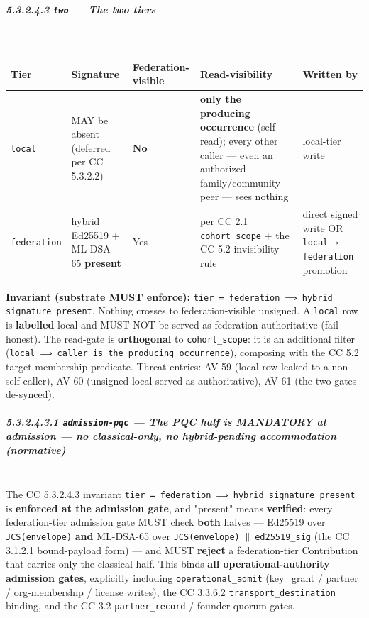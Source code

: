 \documentclass[11pt]{article}
\begin{document}
\subparagraph{5.3.2.4.3 \texttt{two} — The two tiers}\mbox{}\\


{\scriptsize
\begin{longtable}{|p{3.2cm}|p{3.2cm}|p{3.2cm}|p{3.2cm}|p{3.2cm}|}\hline
\textbf{Tier} & \textbf{Signature} & \textbf{Federation-visible} & \textbf{Read-visibility} & \textbf{Written by} \\ \hline\endhead
\texttt{local} & MAY be absent (deferred per CC 5.3.2.2) & \textbf{No} & \textbf{only the producing occurrence} (self-read); every other caller — even an authorized family/community peer — sees nothing & local-tier write \\ \hline
\texttt{federation} & hybrid Ed25519 + ML-DSA-65 \textbf{present} & Yes & per CC 2.1 \texttt{cohort\_scope} + the CC 5.2 invisibility rule & direct signed write OR \texttt{local → federation} promotion \\ \hline
\end{longtable}}


\textbf{Invariant (substrate MUST enforce):} \texttt{tier = federation ⟹ hybrid signature present}. Nothing crosses to federation-visible unsigned. A \texttt{local} row is \textbf{labelled} local and MUST NOT be served as federation-authoritative (fail-honest). The read-gate is \textbf{orthogonal} to \texttt{cohort\_scope}: it is an additional filter (\texttt{local ⟹ caller is the producing occurrence}), composing with the CC 5.2 target-membership predicate. Threat entries: AV-59 (local row leaked to a non-self caller), AV-60 (unsigned local served as authoritative), AV-61 (the two gates de-synced).


\subparagraph{5.3.2.4.3.1 \texttt{admission-pqc} — The PQC half is MANDATORY at admission — no classical-only, no hybrid-pending accommodation (normative)}\mbox{}\\


The CC 5.3.2.4.3 invariant \texttt{tier = federation ⟹ hybrid signature present} is \textbf{enforced at the admission gate}, and "present" means \textbf{verified}: every federation-tier admission gate MUST check \textbf{both} halves — Ed25519 over \texttt{JCS(envelope)} \textbf{and} ML-DSA-65 over \texttt{JCS(envelope) ‖ ed25519\_sig} (the CC 3.1.2.1 bound-payload form) — and MUST \textbf{reject} a federation-tier Contribution that carries only the classical half. This binds \textbf{all operational-authority admission gates}, explicitly including \texttt{operational\_admit} (key\_grant / partner / org-membership / license writes), the CC 3.3.6.2 \texttt{transport\_destination} binding, and the CC 3.2 \texttt{partner\_record} / founder-quorum gates.
\end{document}
